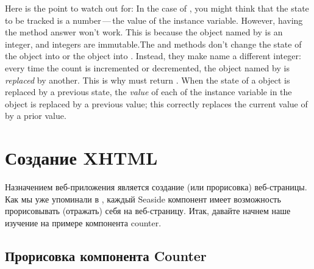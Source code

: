 \documentclass[a4paper,10pt,twoside]{book}
\begin{document}
Here is the point to watch out for:
In the case of , you might think that the state to be tracked is a
number\,---\,the value of the  instance variable.
However, having the  method answer  won't work.  
This is because the object named by  is an integer, and integers are
immutable.The  and  methods don't change the state of the
object 
into  or the object  into .
Instead, they make  name a different integer: 
every time the count is incremented or decremented, the object named by  is
\emph{replaced} by another.
This is why  must return .
When the state of a \mbox{} object is replaced by a previous state, the
\emph{value} of each of the instance variable in the object is replaced by a previous
value; this correctly replaces the current value of  by a prior value.

\section{Создание XHTML}


Назначением веб-приложения является создание (или прорисовка) веб-страницы.
Как мы уже упоминали в ,
каждый Seaside компонент имеет возможность прорисовывать (отражать) себя на веб-страницу.
Итак, давайте начнем наше изучение на примере компонента counter.

\subsection{Прорисовка компонента Counter}

\end{document}
